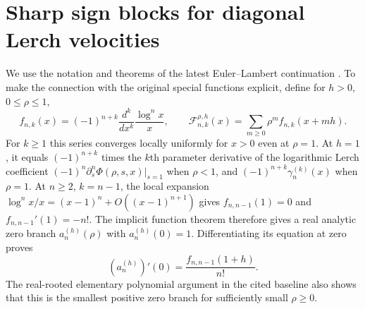 
\section{Sharp sign blocks for diagonal Lerch velocities}
\label{newdiag:sec:blocks}

We use the notation and theorems of the latest Euler--Lambert
continuation \cite{RepoLerch}.  To make the connection with the original special
functions explicit, define for $h>0$, $0\leq\rho\leq1$,
\[
 f_{n,k}(x)=(-1)^{n+k}\frac{d^k}{dx^k}
                    \frac{\log^n x}{x},\qquad
 \mathcal F_{n,k}^{\rho,h}(x)
       =\sum_{m\geq0}\rho^m f_{n,k}(x+mh).
\]
For $k\geq1$ this series converges locally uniformly for $x>0$
even at $\rho=1$.  At $h=1$, it equals $(-1)^{n+k}$ times the
$k$th parameter derivative of the logarithmic Lerch coefficient
$(-1)^n\partial_s^n\Phi(\rho,s,x)|_{s=1}$ when $\rho<1$,
and $(-1)^{n+k}\gamma_n^{(k)}(x)$ when $\rho=1$.
At $n\geq2$, $k=n-1$, the local expansion
$\log^n x/x=(x-1)^n+O((x-1)^{n+1})$ gives
$f_{n,n-1}(1)=0$ and $f_{n,n-1}'(1)=-n!$.
The implicit function theorem therefore gives a real analytic zero
branch $a_n^{(h)}(\rho)$ with $a_n^{(h)}(0)=1$.
Differentiating its equation at zero proves
\[
 (a_n^{(h)})'(0)=\frac{f_{n,n-1}(1+h)}{n!}.
\]
The real-rooted elementary polynomial argument in the cited baseline
also shows that this is the smallest positive zero branch for
sufficiently small $\rho\geq0$.

